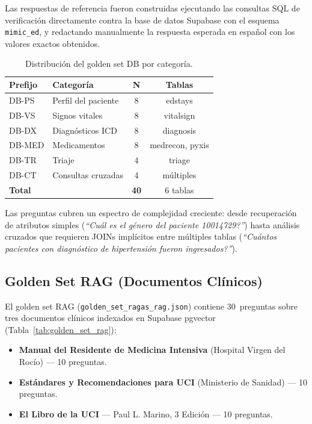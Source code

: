 \documentclass[11pt,a4paper,twocolumn]{article}
\begin{document}
Las respuestas de referencia fueron construidas ejecutando las consultas SQL de verificaci\'{o}n directamente contra la base de datos Supabase con el esquema \texttt{mimic\_ed}, y redactando manualmente la respuesta esperada en espa\~{n}ol con los valores exactos obtenidos.

\begin{table}[H]
\centering
\caption{Distribuci\'{o}n del golden set DB por categor\'{i}a.}
\label{tab:golden_set}
\footnotesize
\begin{tabularx}{\columnwidth}{lXcc}
\toprule
\textbf{Prefijo} & \textbf{Categor\'{i}a} & \textbf{N} & \textbf{Tablas} \\
\midrule
DB-PS  & Perfil del paciente   & 8 & edstays \\
DB-VS  & Signos vitales        & 8 & vitalsign \\
DB-DX  & Diagn\'{o}sticos ICD  & 8 & diagnosis \\
DB-MED & Medicamentos          & 8 & medrecon, pyxis \\
DB-TR  & Triaje                & 4 & triage \\
DB-CT  & Consultas cruzadas    & 4 & m\'{u}ltiples \\
\midrule
\textbf{Total} & & \textbf{40} & 6 tablas \\
\bottomrule
\end{tabularx}
\end{table}

Las preguntas cubren un espectro de complejidad creciente: desde recuperaci\'{o}n de atributos simples (\textit{``\textquestiondown Cu\'{a}l es el g\'{e}nero del paciente 10014729?''}) hasta an\'{a}lisis cruzados que requieren JOINs impl\'{i}citos entre m\'{u}ltiples tablas (\textit{``\textquestiondown Cu\'{a}ntos pacientes con diagn\'{o}stico de hipertensi\'{o}n fueron ingresados?''}).

\subsection{Golden Set RAG (Documentos Cl\'{i}nicos)}

El golden set RAG (\texttt{golden\_set\_ragas\_rag.json}) contiene 30~preguntas sobre tres documentos cl\'{i}nicos indexados en Supabase pgvector (Tabla~\ref{tab:golden_set_rag}):

\begin{itemize}[nosep, leftmargin=*]
  \item \textbf{Manual del Residente de Medicina Intensiva} (Hospital Virgen del Roc\'{i}o) --- 10 preguntas.
  \item \textbf{Est\'{a}ndares y Recomendaciones para UCI} (Ministerio de Sanidad) --- 10 preguntas.
  \item \textbf{El Libro de la UCI} --- Paul L. Marino, 3\textordfeminine{} Edici\'{o}n --- 10 preguntas.
\end{itemize}
\end{document}
